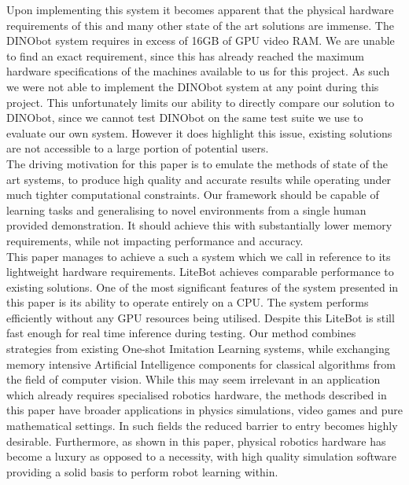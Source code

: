 Upon implementing this system it becomes apparent that the physical hardware requirements of this and many other state of the art solutions are immense. The DINObot system requires in excess of 16GB of GPU video RAM. We are unable to find an exact requirement, since this has already reached the maximum hardware specifications of the machines available to us for this project. As such we were not able to implement the DINObot system at any point during this project. This unfortunately limits our ability to directly compare our solution to DINObot, since we cannot test DINObot on the same test suite we use to evaluate our own system. However it does highlight this issue, existing solutions are not accessible to a large portion of potential users.\\

The driving motivation for this paper is to emulate the methods of state of the art systems, to produce high quality and accurate results while operating under much tighter computational constraints. Our framework should be capable of learning tasks and generalising to novel environments from a single human provided demonstration. It should achieve this with substantially lower memory requirements, while not impacting performance and accuracy.\\

This paper manages to achieve a such a system which we call  in reference to its lightweight hardware requirements. LiteBot achieves comparable performance to existing solutions. One of the most significant features of the system presented in this paper is its ability to operate entirely on a CPU. The system performs efficiently without any GPU resources being utilised. Despite this LiteBot is still fast enough for real time inference during testing. Our method combines strategies from existing One-shot Imitation Learning systems, while exchanging memory intensive Artificial Intelligence components for classical algorithms from the field of computer vision. While this may seem irrelevant in an application which already requires specialised robotics hardware, the methods described in this paper have broader applications in physics simulations, video games and pure mathematical settings. In such fields the reduced barrier to entry becomes highly desirable. Furthermore, as shown in this paper, physical robotics hardware has become a luxury as opposed to a necessity, with high quality simulation software providing a solid basis to perform robot learning within.\\

